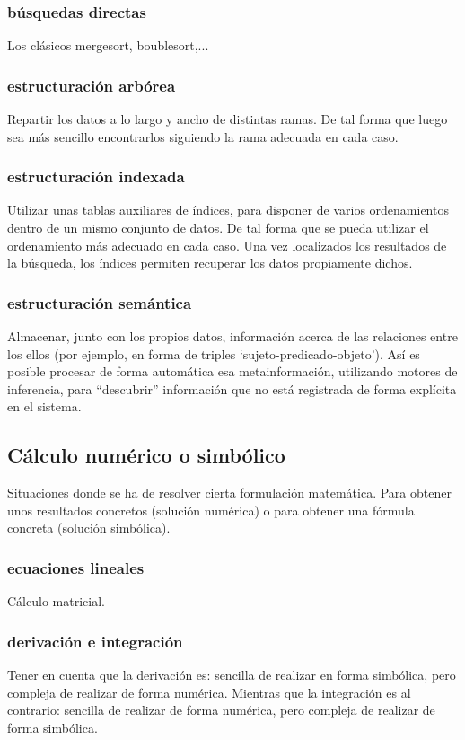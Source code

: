 \documentclass[spanish,12pt,a4paper,final,oneside]{book}
\begin{document}
\subsubsection{búsquedas directas}
Los clásicos mergesort, boublesort,...

\subsubsection{estructuración arbórea}
Repartir los datos a lo largo y ancho de distintas ramas. De tal forma que luego sea más sencillo encontrarlos siguiendo la rama adecuada en cada caso.

\subsubsection{estructuración indexada}
Utilizar unas tablas auxiliares de índices, para disponer de varios ordenamientos dentro de un mismo conjunto de datos. De tal forma que se pueda utilizar el ordenamiento más adecuado en cada caso. Una vez localizados los resultados de la búsqueda, los índices permiten recuperar los datos propiamente dichos.

\subsubsection{estructuración semántica}
Almacenar, junto con los propios datos, información acerca de las relaciones entre los ellos (por ejemplo, en forma de triples `sujeto-predicado-objeto'). Así es posible procesar de forma automática esa metainformación, utilizando motores de inferencia, para ``descubrir'' información que no está registrada de forma explícita en el sistema.

\subsection{Cálculo numérico o simbólico}
Situaciones donde se ha de resolver cierta formulación matemática. Para obtener unos resultados concretos (solución numérica) o para obtener una fórmula concreta (solución simbólica).

\subsubsection{ecuaciones lineales}
Cálculo matricial.

\subsubsection{derivación e integración}
Tener en cuenta que la derivación es: sencilla de realizar en forma simbólica, pero compleja de realizar de forma numérica. Mientras que la integración es al contrario: sencilla de realizar de forma numérica, pero compleja de realizar de forma simbólica.
\end{document}
